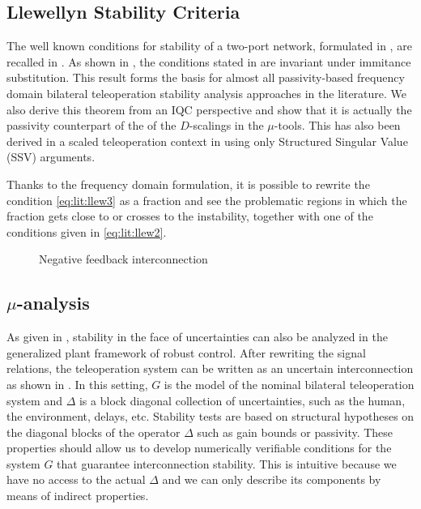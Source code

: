 \subsection{Llewellyn Stability Criteria}\label{sec:llewellyn}
The well known conditions for stability of a two-port network, formulated in \cite{llewellyn,bolinder,rollett}, 
are recalled in . As shown in \cite{rollett}, the conditions stated in  
are invariant under immitance substitution. This result forms the basis for almost all passivity-based frequency 
domain bilateral teleoperation stability analysis approaches in the literature. We also derive this theorem 
from an IQC perspective and show that it is actually the passivity counterpart of the of the $D$-scalings in the 
$\mu$-tools. This has also been derived in a scaled teleoperation context in \cite{poortenyokokohji} using only 
Structured Singular Value (SSV) arguments. 

Thanks to the frequency domain formulation, it is possible  to rewrite the condition \eqref{eq:lit:llew3} as a fraction 
and see the problematic regions in which the fraction gets close to or crosses to the instability, together with one of the 
conditions given in \eqref{eq:lit:llew2}. 


\begin{figure}%
\centering
{}
\caption{Negative feedback interconnection}%
\label{fig:lit:passint}%
\end{figure}

\subsection{\texorpdfstring{$\mu$}{mu}-analysis}
As given in , stability in the face of uncertainties can also be analyzed in the generalized plant framework 
of robust control. After rewriting the signal relations, the teleoperation system can be written as an uncertain interconnection as 
shown in . In this setting, $G$ is the model of the nominal bilateral teleoperation system and $\Delta$ 
is a block diagonal collection of uncertainties, such as the human, the environment, delays, etc. Stability tests are based on structural 
hypotheses on the diagonal blocks of the operator $\Delta$ such as gain bounds or passivity. These properties should allow us to develop 
numerically verifiable conditions for the system $G$ that guarantee interconnection stability. This is intuitive because we have no access 
to the actual $\Delta$ and we can only describe its components by means of indirect properties. 

